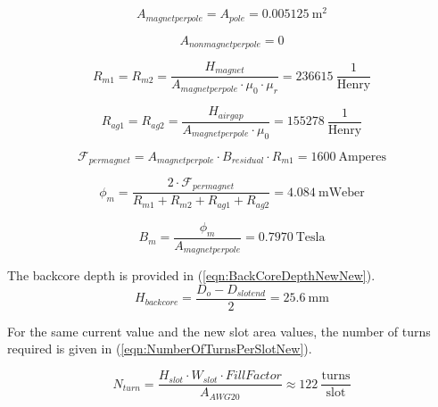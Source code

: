 \documentclass{article}
\begin{document}
\begin{equation} \label{eqn:MagnetAreaPerPoleNewNew}
    A_{magnetperpole} = A_{pole} = 0.005125 \: \mathrm{m^2}
\end{equation}

\begin{equation} \label{eqn:NonMagnetAreaPerPoleNew}
    A_{nonmagnetperpole} = 0
\end{equation}

\begin{equation} \label{eqn:MagnetReluctanceNew}
    R_{m1}  =  R_{m2} =  \frac{H_{magnet}}{A_{magnetperpole} \cdot \mu_0 \cdot \mu_r}  = 236615 \: \mathrm{\frac{1}{Henry}} 
\end{equation}

\begin{equation} \label{eqn:AirGapReluctanceNew}
    R_{ag1}  =  R_{ag2} =  \frac{H_{airgap}}{A_{magnetperpole} \cdot \mu_0}  =  155278  \: \mathrm{\frac{1}{Henry}} 
\end{equation}

\begin{equation} \label{eqn:MmfPerMagnetNew}
    \mathcal{F}_{permagnet} = A_{magnetperpole} \cdot B_{residual} \cdot R_{m1} = 1600 \: \mathrm{Amperes}
\end{equation}

\begin{equation} \label{eqn:AirGapFluxNew}
    \phi_{m} = \frac{2 \cdot \mathcal{F}_{permagnet}}{R_{m1}+R_{m2}+R_{ag1}+R_{ag2}} = 4.084 \: \mathrm{mWeber}
\end{equation}

\begin{equation} \label{eqn:AirGapFluxDensityNew}
    B_{m} = \frac{\phi_{m}}{A_{magnetperpole}} = 0.7970 \: \mathrm{Tesla}
\end{equation}

The backcore depth is provided in (\ref{eqn:BackCoreDepthNewNew}).
\begin{equation} \label{eqn:BackCoreDepthNewNew}
    H_{backcore} = \frac{D_o - D_{slotend}}{2} = 25.6 \: \mathrm{mm}
\end{equation}

For the same current value and the new slot area values, the number of turns required is given in (\ref{eqn:NumberOfTurnsPerSlotNew}).

\begin{equation} \label{eqn:NumberOfTurnsPerSlotNew}
    N_{turn} = \frac{H_{slot} \cdot W_{slot} \cdot FillFactor}{A_{AWG20}} \approx 122 \: \frac{\mathrm{turns}}{\mathrm{slot}}
\end{equation}
\end{document}
